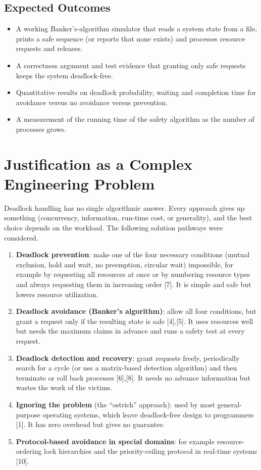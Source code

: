 \documentclass[11pt,a4paper]{report}
\begin{document}
\subsection{Expected Outcomes}
\begin{itemize}
    \item A working Banker's-algorithm simulator that reads a system state from a file, prints a safe sequence (or reports that none exists) and processes resource requests and releases.
    \item A correctness argument and test evidence that granting only safe requests keeps the system deadlock-free.
    \item Quantitative results on deadlock probability, waiting and completion time for avoidance versus no avoidance versus prevention.
    \item A measurement of the running time of the safety algorithm as the number of processes grows.
\end{itemize}

\section{Justification as a Complex Engineering Problem}
Deadlock handling has no single algorithmic answer. Every approach gives up something (concurrency, information, run-time cost, or generality), and the best choice depends on the workload. The following solution pathways were considered.

\begin{enumerate}
    \item \textbf{Deadlock prevention}: make one of the four necessary conditions (mutual exclusion, hold and wait, no preemption, circular wait) impossible, for example by requesting all resources at once or by numbering resource types and always requesting them in increasing order [7]. It is simple and safe but lowers resource utilization.
    \item \textbf{Deadlock avoidance (Banker's algorithm)}: allow all four conditions, but grant a request only if the resulting state is safe [4],[5]. It uses resources well but needs the maximum claims in advance and runs a safety test at every request.
    \item \textbf{Deadlock detection and recovery}: grant requests freely, periodically search for a cycle (or use a matrix-based detection algorithm) and then terminate or roll back processes [6],[8]. It needs no advance information but wastes the work of the victims.
    \item \textbf{Ignoring the problem} (the ``ostrich'' approach): used by most general-purpose operating systems, which leave deadlock-free design to programmers [1]. It has zero overhead but gives no guarantee.
    \item \textbf{Protocol-based avoidance in special domains}: for example resource-ordering lock hierarchies and the priority-ceiling protocol in real-time systems [10].
\end{enumerate}
\end{document}
